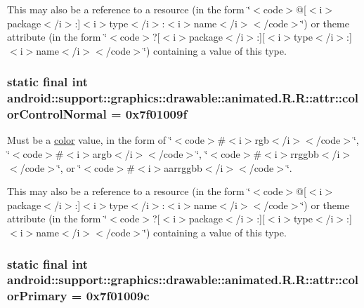 This may also be a reference to a resource (in the form \char`\"{}$<$code$>$@\mbox{[}$<$i$>$package$<$/i$>$:\mbox{]}$<$i$>$type$<$/i$>$:$<$i$>$name$<$/i$>$$<$/code$>$\char`\"{}) or theme attribute (in the form \char`\"{}$<$code$>$?\mbox{[}$<$i$>$package$<$/i$>$:\mbox{]}\mbox{[}$<$i$>$type$<$/i$>$:\mbox{]}$<$i$>$name$<$/i$>$$<$/code$>$\char`\"{}) containing a value of this type. \hypertarget{classandroid_1_1support_1_1graphics_1_1drawable_1_1animated_1_1_r_1_1attr_af02e72ccd1066ca4962bf5f3a2cd3d2}{
\subsubsection[{colorControlNormal}]{\setlength{\rightskip}{0pt plus 5cm}static final int android::support::graphics::drawable::animated.R.R::attr::colorControlNormal = 0x7f01009f}}
\label{classandroid_1_1support_1_1graphics_1_1drawable_1_1animated_1_1_r_1_1attr_af02e72ccd1066ca4962bf5f3a2cd3d2}


Must be a \hyperlink{classandroid_1_1support_1_1graphics_1_1drawable_1_1animated_1_1_r_1_1color}{color} value, in the form of \char`\"{}$<$code$>$\#$<$i$>$rgb$<$/i$>$$<$/code$>$\char`\"{}, \char`\"{}$<$code$>$\#$<$i$>$argb$<$/i$>$$<$/code$>$\char`\"{}, \char`\"{}$<$code$>$\#$<$i$>$rrggbb$<$/i$>$$<$/code$>$\char`\"{}, or \char`\"{}$<$code$>$\#$<$i$>$aarrggbb$<$/i$>$$<$/code$>$\char`\"{}. 

This may also be a reference to a resource (in the form \char`\"{}$<$code$>$@\mbox{[}$<$i$>$package$<$/i$>$:\mbox{]}$<$i$>$type$<$/i$>$:$<$i$>$name$<$/i$>$$<$/code$>$\char`\"{}) or theme attribute (in the form \char`\"{}$<$code$>$?\mbox{[}$<$i$>$package$<$/i$>$:\mbox{]}\mbox{[}$<$i$>$type$<$/i$>$:\mbox{]}$<$i$>$name$<$/i$>$$<$/code$>$\char`\"{}) containing a value of this type. \hypertarget{classandroid_1_1support_1_1graphics_1_1drawable_1_1animated_1_1_r_1_1attr_99c2da94cc305518de10c2953b974877}{
\subsubsection[{colorPrimary}]{\setlength{\rightskip}{0pt plus 5cm}static final int android::support::graphics::drawable::animated.R.R::attr::colorPrimary = 0x7f01009c}}
\label{classandroid_1_1support_1_1graphics_1_1drawable_1_1animated_1_1_r_1_1attr_99c2da94cc305518de10c2953b974877}


